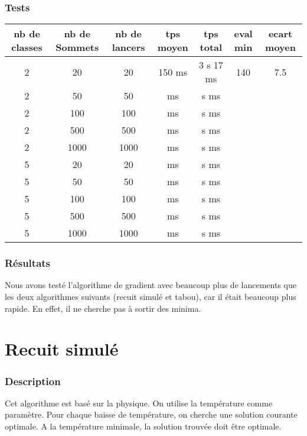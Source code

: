 \documentclass[12pt]{article}
\begin{document}
\section{Tests}

\begin{tabular}{|c|c|c|c|c|c|c|}
	\hline 
	nb de classes & nb de Sommets & nb de lancers & tps moyen & tps total & eval min & ecart moyen \\
	\hline
	2 & 20 & 20 & 150 ms & 3 s 17 ms & 140 & 7.5 \\
	\hline
	2 &  50  &  50  &     ms   &    s    ms   &     &     \\
	\hline
	2 &  100  &  100  &     ms   &   s    ms    &     &     \\
	\hline
	2 &  500  &  500  &      ms  &    s    ms   &     &     \\
	\hline
	2 &  1000  &  1000  &    ms    &   s    ms    &     &     \\
	\hline
	\hline
	5 &  20  &  20  &     ms   &   s    ms    &     &     \\
	\hline
	5 &  50  &  50  &     ms   &   s     ms   &     &     \\
	\hline
	5 &  100  & 100   &     ms   &   s    ms    &     &     \\
	\hline
	5 & 500   & 500   &     ms   &   s     ms   &     &     \\
	\hline
	5 &  1000  &  1000  &     ms   &   s    ms    &     &     \\
	\hline
\end{tabular}

\section{Résultats}

Nous avons testé l’algorithme de gradient avec beaucoup plus de lancements que les deux algorithmes suivants (recuit simulé et tabou), car il était beaucoup plus rapide. En effet, il ne cherche pas à sortir des minima.

\newpage

\part{Recuit simulé}

\section{Description}
Cet algorithme est basé sur la physique. On utilise la température comme paramètre. Pour chaque baisse de température, on cherche une solution courante optimale. A la température minimale, la solution trouvée doit être optimale.
\end{document}
